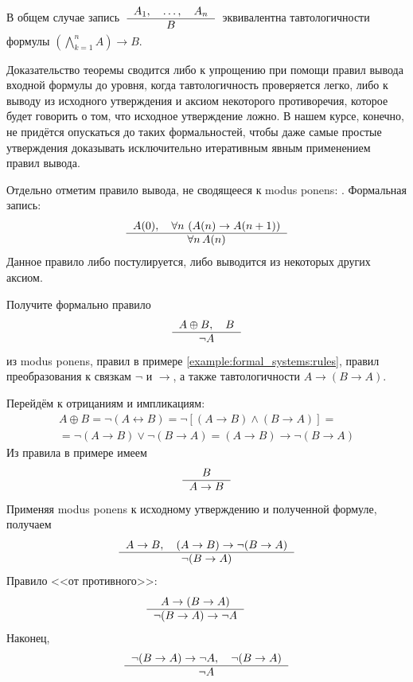 \begin{remark}
    В общем случае запись $ \; \displaystyle \typerule{A_1, \quad \ldots, \quad A_n}{B} \; $
    эквивалентна тавтологичности формулы $ \left( \bigwedge_{k=1}^n A \right) \rightarrow B $.
\end{remark}

Доказательство теоремы сводится либо к упрощению при помощи правил вывода входной формулы до уровня, когда тавтологичность проверяется легко,
либо к выводу из исходного утверждения и аксиом некоторого противоречия, которое будет говорить о том, что исходное утверждение ложно.
В нашем курсе, конечно, не придётся опускаться до таких формальностей, чтобы даже самые простые утверждения доказывать исключительно итеративным явным применением правил вывода.

Отдельно отметим правило вывода, не сводящееся к modus ponens: .
Формальная запись:
\[
    \typerule{A(0), \quad \forall n \, \left( A(n) \rightarrow A(n+1) \right)}{\forall n \, A(n)}
\]
Данное правило либо постулируется, либо выводится из некоторых других аксиом.

\begin{Exercise}[counter=SecExercise]
    \noindent
    Получите формально правило
    \[
        \typerule{A \oplus B, \quad B}{\neg A}
    \]
    из modus ponens, правил в примере \ref{example:formal_systems:rules}, правил преобразования к связкам $ \neg $ и $ \rightarrow $, а также тавтологичности $ A \rightarrow (B \rightarrow A) $.
\end{Exercise}

\begin{Answer}
    \noindent
    Перейдём к отрицаниям и импликациям:
    \begin{multline*}
        A \oplus B = \neg(A \leftrightarrow B) = \neg \left[ (A \rightarrow B) \wedge (B \rightarrow A) \right] = \\
        =\neg (A \rightarrow B) \vee \neg (B \rightarrow A) = (A \rightarrow B) \rightarrow \neg (B \rightarrow A)
    \end{multline*}
    Из правила в примере имеем
    \[
        \typerule{B}{A \rightarrow B}
    \]
    Применяя modus ponens к исходному утверждению и полученной формуле, получаем
    \[
        \typerule{A \rightarrow B, \quad (A \rightarrow B) \rightarrow \neg (B \rightarrow A)}{\neg (B \rightarrow A)}
    \]
    Правило <<от противного>>:
    \[
        \typerule{A \rightarrow (B \rightarrow A)}{\neg (B \rightarrow A) \rightarrow \neg A} \qquad
    \]
    Наконец,
    \[
        \typerule{\neg (B \rightarrow A) \rightarrow \neg A, \quad \neg (B \rightarrow A)}{\neg A}
    \]
\end{Answer}

